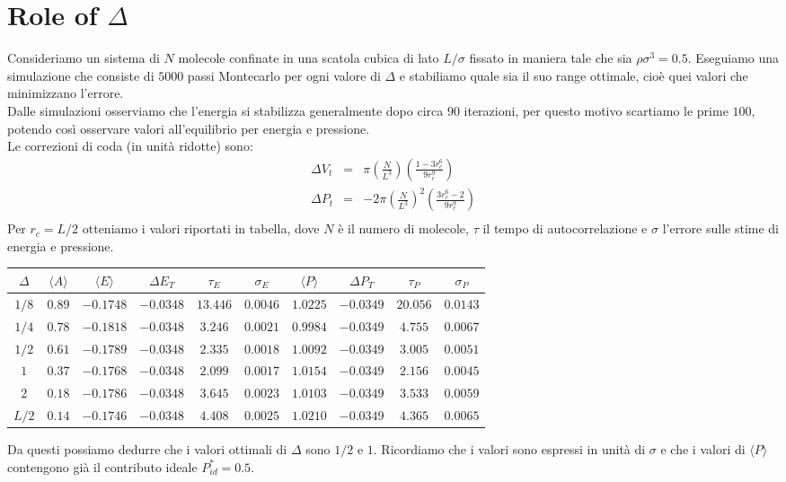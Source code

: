 \documentclass[a4paper,11pt]{article}
\begin{document}
\section*{Role of $\Delta$}
\noindent Consideriamo un sistema di $N$ molecole confinate in una scatola cubica di lato $L/\sigma$ fissato in maniera tale che sia $\rho \sigma^3 = 0.5$. Eseguiamo una simulazione che consiste di $5000$ passi Montecarlo per ogni valore di $\Delta$ e stabiliamo quale sia il suo range ottimale, cioè quei valori che minimizzano l'errore.\\ 
Dalle simulazioni osserviamo che l'energia si stabilizza generalmente dopo circa $90$ iterazioni, per questo motivo scartiamo le prime $100$, potendo così osservare valori all'equilibrio per energia e pressione.\\ 
Le correzioni di coda (in unità ridotte) sono:
\begin{eqnarray*}
	\Delta V_t&=&\pi \left(\frac{N}{L^3}\right) \left(\frac{1-3r_c^6}{9r_c^9}\right)\\
	\Delta P_t&=&-2 \pi \left( \frac{N}{L^3} \right)^2 \left(\frac{3r_c^6-2}{9r_c^9}\right)\\
\end{eqnarray*}
\medskip
Per $r_c=L/2$ otteniamo i valori riportati in tabella, dove $N$ è il numero di molecole, $\tau$ il tempo di autocorrelazione e $\sigma$ l'errore sulle stime di energia e pressione. \\
\medskip 
\begin{table}[H]
	\centering
	\begin{tabular}{cccccccccc} 
		\hline
		$\Delta$	&	$ \langle A \rangle $	&	$ \langle E \rangle $	&	$\Delta E_T$	&	$\tau_E$	&	$\sigma_E$	&	$ \langle P \rangle $	&	$\Delta P_T$	&	$\tau_P$	&	$\sigma_P$\\
		\hline
		$1/8$	&	$0.89$	&	$-0.1748$	&	$-0.0348$	&	$13.446$	&	$0.0046$	&	$1.0225$	&	$-0.0349$	&	$20.056$	&	$0.0143$\\
		$1/4$	&	$0.78$	&	$-0.1818$	&	$-0.0348$	&   $3.246$		&	$0.0021$	&	$0.9984$	&	$-0.0349$	&	$4.755$		&	$0.0067$\\
		$1/2$	&	$0.61$	&	$-0.1789$	&	$-0.0348$	&	$2.335$		&	$0.0018$	&	$1.0092$	&	$-0.0349$	&	$3.005$		&	$0.0051$\\
		$1$		&	$0.37$	&	$-0.1768$	&	$-0.0348$	&	$2.099$		&	$0.0017$	&	$1.0154$	&	$-0.0349$	&	$2.156$		&	$0.0045$\\
		$2$		&	$0.18$	&	$-0.1786$	&	$-0.0348$	&	$3.645$		&	$0.0023$	&	$1.0103$	&	$-0.0349$	&	$3.533$		&	$0.0059$\\
		$L/2$	&	$0.14$	&	$-0.1746$	&	$-0.0348$	&	$4.408$		&	$0.0025$	&	$1.0210$	&	$-0.0349$	&	$4.365$		&	$0.0065$\\
		\hline
	\end{tabular}
\end{table}
\medskip
\noindent Da questi possiamo dedurre che i valori ottimali di $\Delta$ sono $1/2$ e $1$. Ricordiamo che i valori sono espressi in unità di $\sigma$ e che i valori di $ \langle P \rangle $ contengono già il contributo ideale $P^*_{id}= 0.5$.\\
\end{document}
